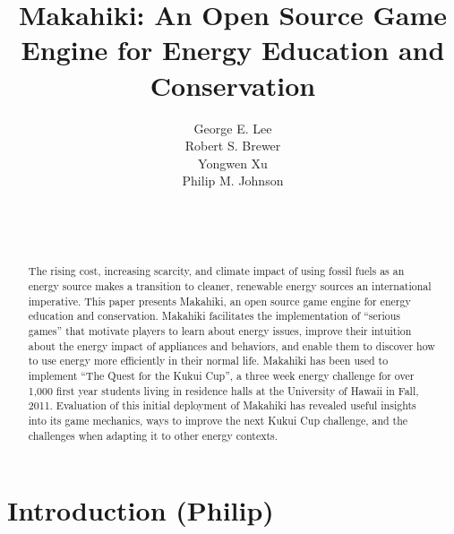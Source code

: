 \documentclass{acm_proc_article-sp}
\begin{document}
\title{Makahiki: An Open Source Game Engine for Energy Education and Conservation}


\author{
George E. Lee\\
Robert S. Brewer\\
Yongwen Xu\\
Philip M. Johnson\\
       \\
       \\
       \\
}

\maketitle
\begin{abstract}
  The rising cost, increasing scarcity, and climate impact of using fossil
  fuels as an energy source makes a transition to cleaner, renewable energy
  sources an international imperative.  This paper presents Makahiki, an
  open source game engine for energy education and conservation.  Makahiki
  facilitates the implementation of ``serious games'' that motivate players
  to learn about energy issues, improve their intuition about the energy
  impact of appliances and behaviors, and enable them to discover how to
  use energy more efficiently in their normal life.  Makahiki has been
  used to implement ``The Quest for the Kukui Cup'', a three week energy
  challenge for over 1,000 first year students living in residence halls at
  the University of Hawaii in Fall, 2011.   Evaluation of this initial
  deployment of Makahiki has revealed useful insights into its game
  mechanics, ways to improve the next Kukui Cup challenge, and the
  challenges when adapting it to other energy contexts.
\end{abstract}




\section{Introduction (Philip)}
\end{document}
